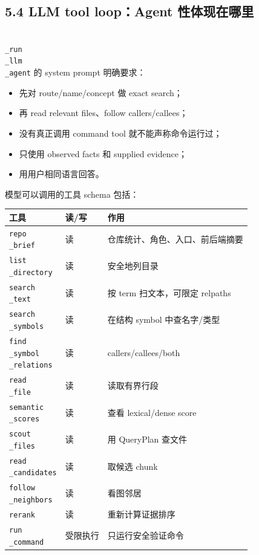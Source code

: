 \documentclass[UTF8,12pt,openany]{ctexbook}
\begin{document}
\subsection{5.4 LLM tool loop：Agent 性体现在哪里}

\texttt{\\_run\\_llm\\_agent} 的 system prompt 明确要求：\par

\begin{itemize}
\item 先对 route/name/concept 做 exact search；
\item 再 read relevant files、follow callers/callees；
\item 没有真正调用 command tool 就不能声称命令运行过；
\item 只使用 observed facts 和 supplied evidence；
\item 用用户相同语言回答。
\end{itemize}

模型可以调用的工具 schema 包括：\par

\begin{center}
\small
\begin{longtable}{|p{}|p{}|p{}|}
\toprule
工具 & 读/写 & 作用 \\
\midrule
\texttt{repo\\_brief} & 读 & 仓库统计、角色、入口、前后端摘要 \\
\texttt{list\\_directory} & 读 & 安全地列目录 \\
\texttt{search\\_text} & 读 & 按 term 扫文本，可限定 relpaths \\
\texttt{search\\_symbols} & 读 & 在结构 symbol 中查名字/类型 \\
\texttt{find\\_symbol\\_relations} & 读 & callers/callees/both \\
\texttt{read\\_file} & 读 & 读取有界行段 \\
\texttt{semantic\\_scores} & 读 & 查看 lexical/dense score \\
\texttt{scout\\_files} & 读 & 用 QueryPlan 查文件 \\
\texttt{read\\_candidates} & 读 & 取候选 chunk \\
\texttt{follow\\_neighbors} & 读 & 看图邻居 \\
\texttt{rerank} & 读 & 重新计算证据排序 \\
\texttt{run\\_command} & 受限执行 & 只运行安全验证命令 \\
\bottomrule
\end{longtable}
\end{center}
\end{document}

